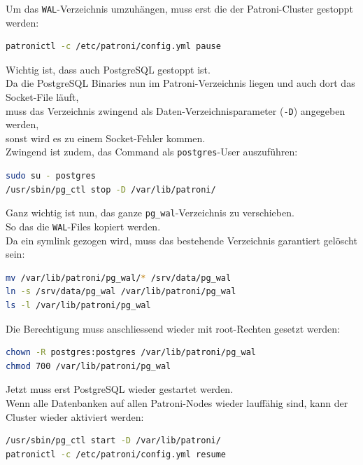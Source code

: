 Um das \texttt{WAL}-Verzeichnis umzuhängen, muss erst die der Patroni-Cluster gestoppt werden:
\lstset{style=gra_codestyle}
\begin{lstlisting}[language=bash, caption=Patroni - 250GiB Cluster Pause,captionpos=b,label={lst:patroni_250gib_cluster_stop},breaklines=true]
patronictl -c /etc/patroni/config.yml pause
\end{lstlisting}

Wichtig ist, dass auch PostgreSQL gestoppt ist.\\
Da die PostgreSQL Binaries nun im Patroni-Verzeichnis liegen und auch dort das Socket-File läuft,\\
muss das Verzeichnis zwingend als Daten-Verzeichnisparameter (\texttt{-D}) angegeben werden,\\
sonst wird es zu einem Socket-Fehler kommen.\\
Zwingend ist zudem, das Command als \texttt{postgres}-User auszuführen:
\lstset{style=gra_codestyle}
\begin{lstlisting}[language=bash, caption=Patroni - 250GiB PostgreSQL stoppen,captionpos=b,label={lst:patroni_250gib_stop_postgresql},breaklines=true]
sudo su - postgres
/usr/sbin/pg_ctl stop -D /var/lib/patroni/
\end{lstlisting}

Ganz wichtig ist nun, das ganze \texttt{pg\_wal}-Verzeichnis zu verschieben.\\
So das die \texttt{WAL}-Files kopiert werden.\\
Da ein symlink gezogen wird, muss das bestehende Verzeichnis garantiert gelöscht sein:
\lstset{style=gra_codestyle}
\begin{lstlisting}[language=bash, caption=Patroni - 250GiB move pg\_wal,captionpos=b,label={lst:patroni_250gib_move_pg_wal},breaklines=true]
mv /var/lib/patroni/pg_wal/* /srv/data/pg_wal
ln -s /srv/data/pg_wal /var/lib/patroni/pg_wal
ls -l /var/lib/patroni/pg_wal
\end{lstlisting}

Die Berechtigung muss anschliessend wieder mit root-Rechten gesetzt werden:
\lstset{style=gra_codestyle}
\begin{lstlisting}[language=bash, caption=Patroni - 250GiB chmod - chown pg\_wal,captionpos=b,label={lst:patroni_250gib_chmod_chown_pg_wal},breaklines=true]
chown -R postgres:postgres /var/lib/patroni/pg_wal
chmod 700 /var/lib/patroni/pg_wal
\end{lstlisting}

Jetzt muss erst PostgreSQL wieder gestartet werden.\\
Wenn alle Datenbanken auf allen Patroni-Nodes wieder lauffähig sind, kann der Cluster wieder aktiviert werden:
\lstset{style=gra_codestyle}
\begin{lstlisting}[language=bash, caption=Patroni - 250GiB PostgreSQL - Patroni resume,captionpos=b,label={lst:patroni_250gib_postgresql_patroni_resume},breaklines=true]
/usr/sbin/pg_ctl start -D /var/lib/patroni/
patronictl -c /etc/patroni/config.yml resume
\end{lstlisting}

